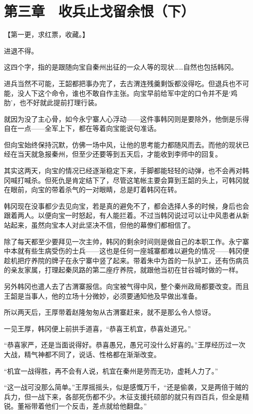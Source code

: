 \section{第三章　收兵止戈留余恨（下）}

【第一更，求红票，收藏。】

进退不得。

这四个字，指的是跟随向宝自秦州出征的一众人等的现状……自然也包括韩冈。

进兵当然不可能，王韶都把事办完了，去古渭连残羹剩饭都没得吃。但退兵也不可能，没人下这个命令，谁也不敢自作主张。向宝早前给军中定的口令并不是‘鸡肋’，也不好就此提前打理行装。

就因为没了主心骨，如今永宁寨人心浮动——这件事韩冈则是要除外，他倒是乐得自在一点——全军上下，都在等着向宝能说句准话。

但向宝始终保持沉默，仿佛一场中风，让他的思考能力都随风而去。而他的现状已经在当天就急报秦州，但至少还要等到五天后，才能收到李师中的回复。

其实这两天，向宝的情况已经逐渐稳定下来，手脚都能轻轻的动弹，也不会再对韩冈喊打喊杀。但死仇是肯定结下了，尽管这笔帐主要会算到王韶的头上，可韩冈就在眼前，向宝的带着杀气的一对眼睛，总是盯着韩冈在转。

韩冈现在没事都少去见向宝，若是真的避免不了，都会选择人多的时候，身后也会跟着两人。以便向宝一时怒起，有人能拦着。不过当韩冈说过可以让中风患者从新站起来，虽然向宝本人对此坚决不信，但他的幕僚们都相信了。

除了每天都至少要拜见一次主帅，韩冈的剩余时间则是做自己的本职工作。永宁寨中本就有些生病受伤的士兵——这也是任何一座城寨都难以避免的情况——韩冈便趁机把疗养院的牌子在永宁寨中竖了起来。带着朱中为首的一队护工，还有伤病员的亲友家属，打理起秦凤路的第二座疗养院，就跟他当初在甘谷城时做的一样。

另外韩冈也遣人去了古渭寨报信。向宝被气得中风，整个秦州政局都要改变。而且王韶是当事人，他的立场十分微妙，必须要通知他及早做出准备。

所以两天后，王厚带着赵隆匆匆从古渭寨赶来，就不是那么令人惊讶。

一见王厚，韩冈便上前拱手道喜，“恭喜王机宜，恭喜处道兄。”

“恭喜家严，还是当面说得好。恭喜愚兄，愚兄可没什么好喜的。”王厚经历过一次大战，精气神都不同了，说话、性格都在渐渐改变。

“机宜一战得胜，再不会有人说，机宜在秦州是劳而无功，虚耗人力了。”

“这一战可没那么简单。”王厚摇摇头，似是感慨万千，“还是偷袭，又是两倍于贼的兵力，但一战下来，各部死伤都不少。木征支援托硕部的就只有四百兵，但全是精锐。董裕带着他们一个反击，差点就给他翻盘。”

